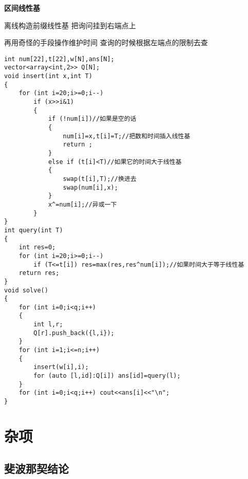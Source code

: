 \documentclass[a4paper]{ctexart}
\begin{document}
\textbf{区间线性基}

离线构造前缀线性基 \quad 把询问挂到右端点上 \quad 

再用奇怪的手段操作维护时间 \quad 查询的时候根据左端点的限制去查

\begin{lstlisting}
int num[22],t[22],w[N],ans[N];
vector<array<int,2>> Q[N];
void insert(int x,int T)
{
    for (int i=20;i>=0;i--)
        if (x>>i&1)
        {
            if (!num[i])//如果是空的话
            {
                num[i]=x,t[i]=T;//把数和时间插入线性基
                return ;
            }
            else if (t[i]<T)//如果它的时间大于线性基
            {
                swap(t[i],T);//换进去
                swap(num[i],x);
            }
            x^=num[i];//异或一下
        }
}
int query(int T)
{
    int res=0;
    for (int i=20;i>=0;i--)
        if (T<=t[i]) res=max(res,res^num[i]);//如果时间大于等于线性基
    return res;
}
void solve()
{
    for (int i=0;i<q;i++)
    {
        int l,r;
        Q[r].push_back({l,i});
    }
    for (int i=1;i<=n;i++)
    {
        insert(w[i],i);
        for (auto [l,id]:Q[i]) ans[id]=query(l);
    }
    for (int i=0;i<q;i++) cout<<ans[i]<<"\n";
}
\end{lstlisting}

\section{杂项}

\subsection{斐波那契结论}
\end{document}
